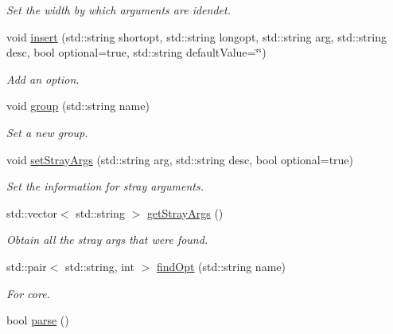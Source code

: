 \begin{DoxyCompactItemize}
\begin{DoxyCompactList}\small\item\em Set the width by which arguments are idendet. \end{DoxyCompactList}\item 
void \hyperlink{class_c_l_i_a41430ab40b87a3f30f392a4d241174c5}{insert} (std\+::string shortopt, std\+::string longopt, std\+::string arg, std\+::string desc, bool optional=true, std\+::string default\+Value=\char`\"{}\char`\"{})
\begin{DoxyCompactList}\small\item\em Add an option. \end{DoxyCompactList}\item 
void \hyperlink{class_c_l_i_a46febf028fe81118e4ee0a88199dd885}{group} (std\+::string name)
\begin{DoxyCompactList}\small\item\em Set a new group. \end{DoxyCompactList}\item 
void \hyperlink{class_c_l_i_a883359558097aae1d0401212c16ec98a}{set\+Stray\+Args} (std\+::string arg, std\+::string desc, bool optional=true)
\begin{DoxyCompactList}\small\item\em Set the information for stray arguments. \end{DoxyCompactList}\item 
std\+::vector$<$ std\+::string $>$ \hyperlink{class_c_l_i_a2b166975bb7ebd4a8a775c5ebd8d8bc7}{get\+Stray\+Args} ()
\begin{DoxyCompactList}\small\item\em Obtain all the stray args that were found. \end{DoxyCompactList}\item 
std\+::pair$<$ std\+::string, int $>$ \hyperlink{class_c_l_i_aee8806757f51ea2a0e5bec476a277c0c}{find\+Opt} (std\+::string name)\hypertarget{class_c_l_i_aee8806757f51ea2a0e5bec476a277c0c}{}\label{class_c_l_i_aee8806757f51ea2a0e5bec476a277c0c}

\begin{DoxyCompactList}\small\item\em For core. \end{DoxyCompactList}\item 
bool \hyperlink{class_c_l_i_affcd7f6c33922c4edd9e82b77910c9d6}{parse} ()\hypertarget{class_c_l_i_affcd7f6c33922c4edd9e82b77910c9d6}{}\label{class_c_l_i_affcd7f6c33922c4edd9e82b77910c9d6}


\end{DoxyCompactItemize}
